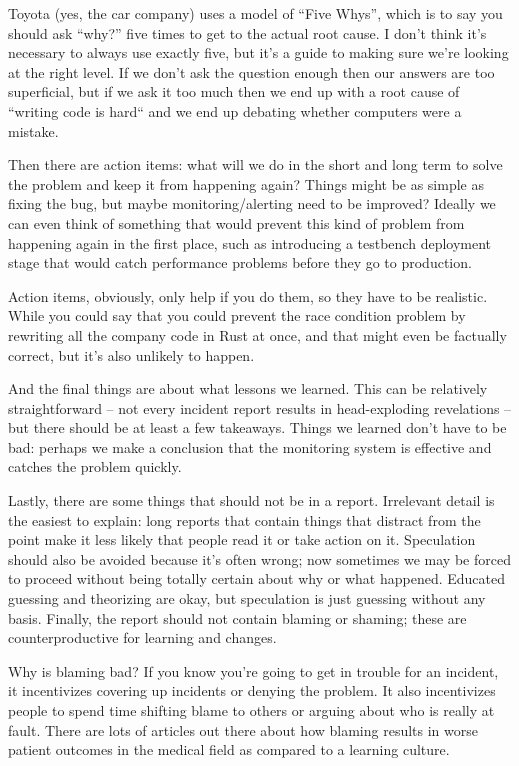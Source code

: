 Toyota (yes, the car company) uses a model of ``Five Whys'', which is to say you should ask ``why?'' five times to get to the actual root cause. I don't think it's necessary to always use exactly five, but it's a guide to making sure we're looking at the right level. If we don't ask the question enough then our answers are too superficial, but if we ask it too much then we end up with a root cause of ``writing code is hard`` and we end up debating whether computers were a mistake.

Then there are action items: what will we do in the short and long term to solve the problem and keep it from happening again? Things might be as simple as fixing the bug, but maybe monitoring/alerting need to be improved? Ideally we can even think of something that would prevent this kind of problem from happening again in the first place, such as introducing a testbench deployment stage that would catch performance problems before they go to production. 

Action items, obviously, only help if you do them, so they have to be realistic. While you could say that you could prevent the race condition problem by rewriting all the company code in Rust at once, and that might even be factually correct, but it's also unlikely to happen.

And the final things are about what lessons we learned. This can be relatively straightforward -- not every incident report results in head-exploding revelations -- but there should be at least a few takeaways. Things we learned don't have to be bad: perhaps we make a conclusion that the monitoring system is effective and catches the problem quickly. 

Lastly, there are some things that should not be in a report. Irrelevant detail is the easiest to explain: long reports that contain things that distract from the point make it less likely that people read it or take action on it. Speculation should also be avoided because it's often wrong; now sometimes we may be forced to proceed without being totally certain about why or what happened. Educated guessing and theorizing are okay, but speculation is just guessing without any basis. Finally, the report should not contain blaming or shaming; these are counterproductive for learning and changes. 

Why is blaming bad? If you know you're going to get in trouble for an incident, it incentivizes covering up incidents or denying the problem. It also incentivizes people to spend time shifting blame to others or arguing about who is really at fault. There are lots of articles out there about how blaming results in worse patient outcomes in the medical field as compared to a learning culture.


